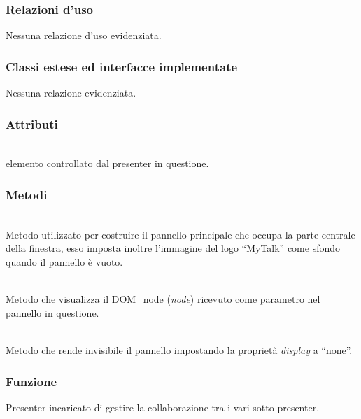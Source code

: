 \subsubsection*{Relazioni d'uso}
Nessuna relazione d'uso evidenziata.

\subsubsection*{Classi estese ed interfacce implementate}
Nessuna relazione evidenziata.

\subsubsection*{Attributi}
\begin{description}
\item{}\\
  elemento controllato dal presenter in questione.
\end{description}

\subsubsection*{Metodi}
\begin{description}
\item{}\\
Metodo utilizzato per costruire il pannello principale che occupa la parte centrale della finestra, esso imposta inoltre l'immagine del logo ``MyTalk'' come sfondo quando il pannello è vuoto.

\item{}\\
Metodo che visualizza il DOM\_node (\textit{node}) ricevuto come parametro nel pannello in questione.
	
\item{}\\
Metodo che rende invisibile il pannello impostando la proprietà \textit{display} a ``none''.

\end{description}


\subsubsection*{Funzione}
Presenter incaricato di gestire la collaborazione tra i vari sotto-presenter.

